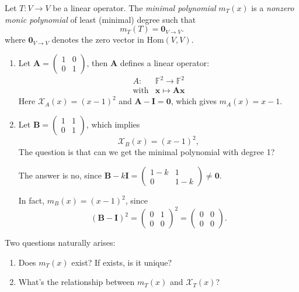 \begin{definition}
Let $T:V\to V$ be a linear operator.
The \emph{minimal polynomial} $m_T(x)$ is a \emph{nonzero monic polynomial} 
of least (minimal) degree such that 
\[
m_T(T)=\bm0_{V\to V}.
\]
where $\bm0_{V\to V}$ denotes the zero vector in $\text{Hom}(V,V)$.
\end{definition}

\begin{example}
\begin{enumerate}
\item
Let $\bm A=\begin{pmatrix}
1&0\\0&1
\end{pmatrix}$, then $\bm A$ defines a linear operator:
\[
\begin{array}{ll}
A:&\mathbb{F}^2\to\mathbb{F}^2\\
\text{with}&\bm x\mapsto\bm A\bm x
\end{array}
\]
Here $\mathcal{X}_{ A}(x) = (x-1)^2$ and $\bm A-\bm I=\bm0$, which gives $m_A(x)=x-1$.
\item
Let $\bm B=\begin{pmatrix}
1&1\\0&1
\end{pmatrix}$, which implies
\[
\mathcal{X}_{ B}(x)=(x-1)^2,
\]
The question is that can we get the minimal polynomial with degree 1?

The answer is no, since $\bm B-k\bm I=\begin{pmatrix}
1-k&1\\0&1-k
\end{pmatrix}\ne\bm0$.

In fact, $m_B(x) = (x-1)^2$, since
\[
(\bm B-\bm I)^2=\begin{pmatrix}
0&1\\0&0
\end{pmatrix}^2=\begin{pmatrix}
0&0\\0&0
\end{pmatrix}.
\]
\end{enumerate}
\end{example}
%
Two questions naturally arises:
\begin{enumerate}
\item
Does $m_T(x)$ exist? If exists, is it unique?
\item
What's the relationship between  $m_T(x)$ and $\mathcal{X}_T(x)$?
\end{enumerate}
